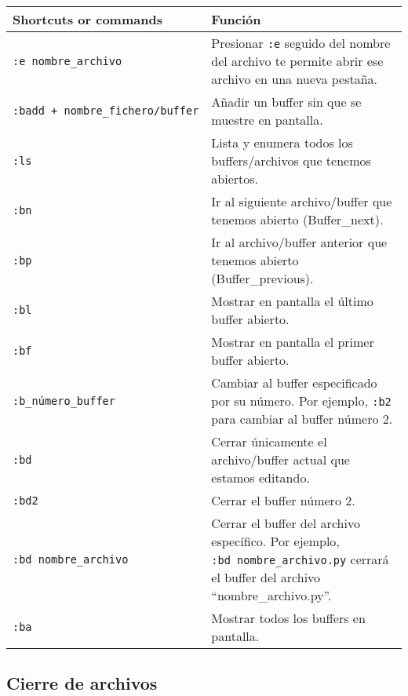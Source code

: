\documentclass[
  doc,
  floatsintext,
  longtable,
  a4paper,
  nolmodern,
  notxfonts,
  notimes,
  colorlinks=true,linkcolor=blue,citecolor=blue,urlcolor=blue]{apa7}
\begin{document}
\begin{longtable}[]{@{}
  >{\raggedright\arraybackslash}p{}
  >{\raggedright\arraybackslash}p{}@{}}
\toprule\noalign{}
\begin{minipage}[b]{\linewidth}\raggedright
Shortcuts or commands
\end{minipage} & \begin{minipage}[b]{\linewidth}\raggedright
Función
\end{minipage} \\
\midrule\noalign{}
\endhead
\bottomrule\noalign{}
\endlastfoot
\texttt{:e\ nombre\_archivo} & Presionar \texttt{:e} seguido del nombre
del archivo te permite abrir ese archivo en una nueva pestaña. \\
\texttt{:badd\ +\ nombre\_fichero/buffer} & Añadir un buffer sin que se
muestre en pantalla. \\
\texttt{:ls} & Lista y enumera todos los buffers/archivos que tenemos
abiertos. \\
\texttt{:bn} & Ir al siguiente archivo/buffer que tenemos abierto
(Buffer\_next). \\
\texttt{:bp} & Ir al archivo/buffer anterior que tenemos abierto
(Buffer\_previous). \\
\texttt{:bl} & Mostrar en pantalla el último buffer abierto. \\
\texttt{:bf} & Mostrar en pantalla el primer buffer abierto. \\
\texttt{:b\_número\_buffer} & Cambiar al buffer especificado por su
número. Por ejemplo, \texttt{:b2} para cambiar al buffer número 2. \\
\texttt{:bd} & Cerrar únicamente el archivo/buffer actual que estamos
editando. \\
\texttt{:bd2} & Cerrar el buffer número 2. \\
\texttt{:bd\ nombre\_archivo} & Cerrar el buffer del archivo específico.
Por ejemplo, \texttt{:bd\ nombre\_archivo.py} cerrará el buffer del
archivo ``nombre\_archivo.py''. \\
\texttt{:ba} & Mostrar todos los buffers en pantalla. \\
\end{longtable}

\subsection{Cierre de archivos}\label{cierre-de-archivos}
\end{document}
